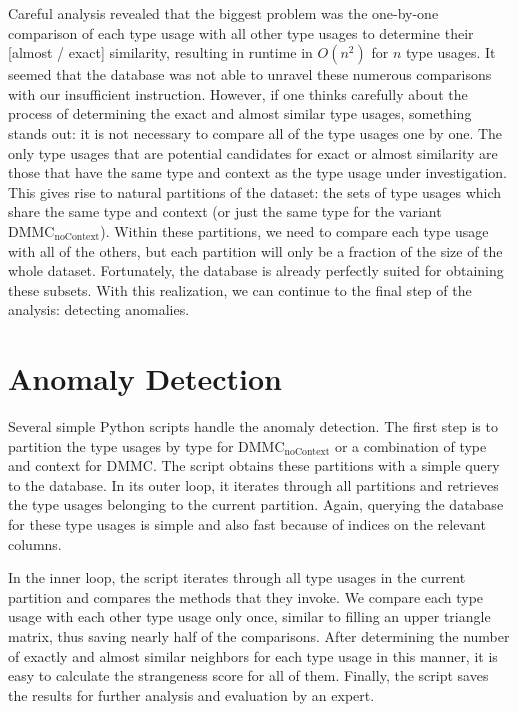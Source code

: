 Careful analysis revealed that the biggest problem was the one-by-one comparison of each type usage with all other type usages to determine their [almost / exact] similarity, resulting in runtime in $O(n^2)$ for $n$ type usages.
It seemed that the database was not able to unravel these numerous comparisons with our insufficient instruction.
However, if one thinks carefully about the process of determining the exact and almost similar type usages, something stands out: it is not necessary to compare all of the type usages one by one.
The only type usages that are potential candidates for exact or almost similarity are those that have the same type and context as the type usage under investigation.
This gives rise to natural partitions of the dataset: the sets of type usages which share the same type and context (or just the same type for the variant $\text{DMMC}_\text{noContext}$).
Within these partitions, we need to compare each type usage with all of the others, but each partition will only be a fraction of the size of the whole dataset.
Fortunately, the database is already perfectly suited for obtaining these subsets.
With this realization, we can continue to the final step of the analysis: detecting anomalies.

\section{Anomaly Detection}\label{sec:anomaly}


Several simple Python scripts handle the anomaly detection.
The first step is to partition the type usages by type for $\text{DMMC}_\text{noContext}$ or a combination of type and context for $\text{DMMC}$.
The script obtains these partitions with a simple query to the database.
In its outer loop, it iterates through all partitions and retrieves the type usages belonging to the current partition.
Again, querying the database for these type usages is simple and also fast because of indices on the relevant columns.

In the inner loop, the script iterates through all type usages in the current partition and compares the methods that they invoke.
We compare each type usage with each other type usage only once, similar to filling an upper triangle matrix, thus saving nearly half of the comparisons.
After determining the number of exactly and almost similar neighbors for each type usage in this manner, it is easy to calculate the strangeness score for all of them.
Finally, the script saves the results for further analysis and evaluation by an expert.

